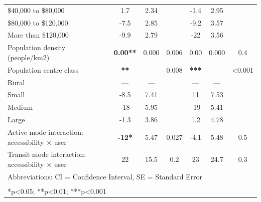 \documentclass[preprint, 3p,
authoryear]{elsarticle} %
\begin{document}
\begin{table}
\begin{tabular}[t]{lcccccc}
\hspace{1em}\$40,000 to \$80,000 & 1.7 & 2.34 &  & -1.4 & 2.95 & \\
\hspace{1em}\$80,000 to \$120,000 & -7.5 & 2.85 &  & -9.2 & 3.57 & \\
\hspace{1em}More than \$120,000 & -9.9 & 2.79 &  & -22 & 3.56 & \\
\addlinespace
Population density (people/km2) & \textbf{0.00**} & 0.000 & 0.006 & 0.00 & 0.000 & 0.4\\
Population centre class & \textbf{**} &  & 0.008 & \textbf{***} &  & <0.001\\
\hspace{1em}Rural & — & — &  & — & — & \\
\hspace{1em}Small & -8.5 & 7.41 &  & 11 & 7.53 & \\
\hspace{1em}Medium & -18 & 5.95 &  & -19 & 5.41 & \\
\addlinespace
\hspace{1em}Large & -1.3 & 3.86 &  & 1.2 & 4.78 & \\
Active mode interaction: accessibility × user & \textbf{-12*} & 5.47 & 0.027 & -4.1 & 5.48 & 0.5\\
Transit mode interaction: accessibility × user & 22 & 15.5 & 0.2 & 23 & 24.7 & 0.3\\
\bottomrule
\multicolumn{7}{l}{\rule{0pt}{1em}Abbreviations: CI = Confidence Interval, SE = Standard Error}\\
\multicolumn{7}{l}{\textsuperscript{} *p<0.05; **p<0.01; ***p<0.001}\\
\end{tabular}
\end{table}

\renewcommand{\thetable}{A.4}
\end{document}
